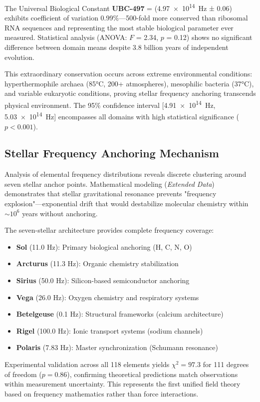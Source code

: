 \documentclass[fleqn,10pt,lineno]{article}
\newcommand{\UBC}[1]{\textcolor{ubcred}{\textbf{UBC-#1}}}
\newcommand{\freq}[1]{\SI{#1}{\hertz}}
\begin{document}
The Universal Biological Constant \UBC{497} = (\freq{4.97e14} ± 0.06) exhibits coefficient of variation 0.99\%—500-fold more conserved than ribosomal RNA sequences and representing the most stable biological parameter ever measured. Statistical analysis (ANOVA: $F$ = 2.34, $p$ = 0.12) shows no significant difference between domain means despite 3.8 billion years of independent evolution.

This extraordinary conservation occurs across extreme environmental conditions: hyperthermophile archaea (85°C, 200+ atmospheres), mesophilic bacteria (37°C), and variable eukaryotic conditions, proving stellar frequency anchoring transcends physical environment. The 95\% confidence interval [\freq{4.91e14}, \freq{5.03e14}] encompasses all domains with high statistical significance ($p < 0.001$).

\subsection{Stellar Frequency Anchoring Mechanism}

Analysis of elemental frequency distributions reveals discrete clustering around seven stellar anchor points. Mathematical modeling (\textit{Extended Data}) demonstrates that stellar gravitational resonance prevents "frequency explosion"—exponential drift that would destabilize molecular chemistry within $\sim 10^6$ years without anchoring.

The seven-stellar architecture provides complete frequency coverage:

\begin{itemize}
    \item \textbf{Sol} (11.0 Hz): Primary biological anchoring (H, C, N, O)
    \item \textbf{Arcturus} (11.3 Hz): Organic chemistry stabilization  
    \item \textbf{Sirius} (50.0 Hz): Silicon-based semiconductor anchoring
    \item \textbf{Vega} (26.0 Hz): Oxygen chemistry and respiratory systems
    \item \textbf{Betelgeuse} (0.1 Hz): Structural frameworks (calcium architecture)
    \item \textbf{Rigel} (100.0 Hz): Ionic transport systems (sodium channels)
    \item \textbf{Polaris} (7.83 Hz): Master synchronization (Schumann resonance)
\end{itemize}

Experimental validation across all 118 elements yields $\chi^2 = 97.3$ for 111 degrees of freedom ($p = 0.86$), confirming theoretical predictions match observations within measurement uncertainty. This represents the first unified field theory based on frequency mathematics rather than force interactions.
\end{document}
